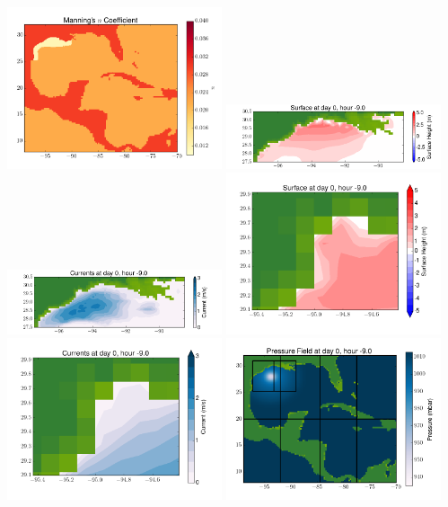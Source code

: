 \documentclass[11pt]{article}
\begin{document}
\vskip 10pt 
\includegraphics[width=0.475\textwidth]{frame0063fig3.png}
\includegraphics[width=0.475\textwidth]{frame0063fig4.png}
\vskip 10pt 
\includegraphics[width=0.475\textwidth]{frame0063fig5.png}
\includegraphics[width=0.475\textwidth]{frame0063fig6.png}
\vskip 10pt 
\includegraphics[width=0.475\textwidth]{frame0063fig7.png}
\includegraphics[width=0.475\textwidth]{frame0063fig8.png}
\end{document}
